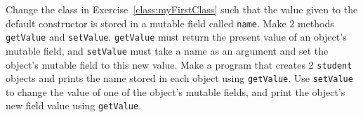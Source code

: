 Change the class in Exercise~\ref{class:myFirstClass} such that the value given to the default constructor is stored in a mutable field called \lstinline{name}. Make 2 methods \lstinline{getValue} and \lstinline{setValue}. \lstinline{getValue} must return the present value of an object's mutable field, and \lstinline{setValue} must take a name as an argument and set the object's mutable field to this new value. Make a program that creates 2 \lstinline{student} objects and prints the name stored in each object using \lstinline{getValue}. Use \lstinline{setValue} to change the value of one of the object's mutable fields, and print the object's new field value using \lstinline{getValue}.
